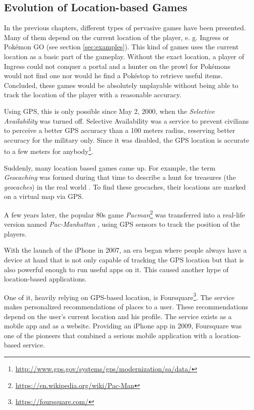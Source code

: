 \subsection{Evolution of Location-based Games}\label{sec:locationBasedGames}
In the previous chapters, different types of pervasive games have been presented. Many of them depend on the current location of the player, e. g. Ingress or Pok\'{e}mon GO (see section \ref{sec:examples}). This kind of games uses the current location as a basic part of the gameplay. Without the exact location, a player of Ingress could not conquer a portal and a hunter on the prowl for Pok\'{e}mons would not find one nor would he find a Pok\'{e}stop to retrieve useful items. Concluded, these games would be absolutely unplayable without being able to track the location of the player with a reasonable accuracy.

Using GPS, this is only possible since May 2, 2000, when the \emph{Selective Availability} was turned off. Selective Availability was a service to prevent civilians to perceive a better GPS accuracy than a 100 meters radius, reserving better accuracy for the military only. Since it was disabled, the GPS location is accurate to a few meters for anybody\footnote{\url{http://www.gps.gov/systems/gps/modernization/sa/data/}}.

Suddenly, many location based games came up. For example, the term \emph{Geocaching} was formed during that time to describe a hunt for treasures (the \emph{geocaches}) in the real world \citep{Geocaching}. To find these geocaches, their locations are marked on a virtual map via GPS.

A few years later, the popular 80s game \emph{Pacman}\footnote{\url{https://en.wikipedia.org/wiki/Pac-Man}} was transferred into a real-life version named \emph{Pac-Manhattan} \citep{Pac-Manhattan}, using GPS sensors to track the position of the players.

With the launch of the iPhone in 2007, an era began where people always have a device at hand that is not only capable of tracking the GPS location but that is also powerful enough to run useful apps on it. This caused another hype of location-based applications.

One of it, heavily relying on GPS-based location, is Foursquare\footnote{\url{https://foursquare.com/}}. The service makes personalized recommendations of places to a user. These recommendations depend on the user's current location and his profile. The service exists as a mobile app and as a website. Providing an iPhone app in 2009, Foursquare was one of the pioneers that combined a serious mobile application with a location-based service.

